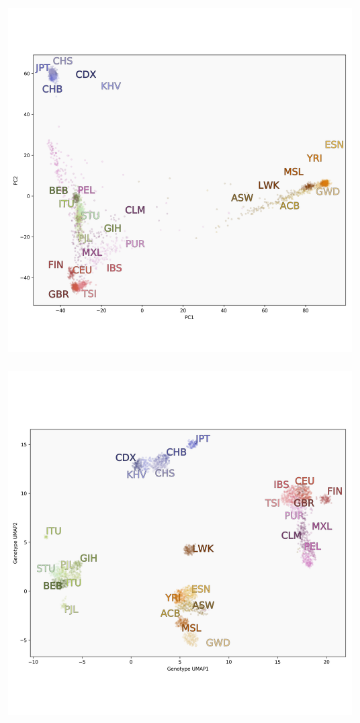 \documentclass[12pt]{article}
\begin{document}
\begin{figure}[h!]
  \centering
  \begin{subfigure}[b]{0.45\linewidth}
    \includegraphics[width=\linewidth]{code/images/1KGP_PCA.png}
    \caption{}
    \label{fig:PCA}
  \end{subfigure}
  \begin{subfigure}[b]{0.45\linewidth}
    \includegraphics[width=\linewidth]{code/images/1KGP_genotype_UMAP.png}

\end{subfigure}
\end{figure}
\end{document}
